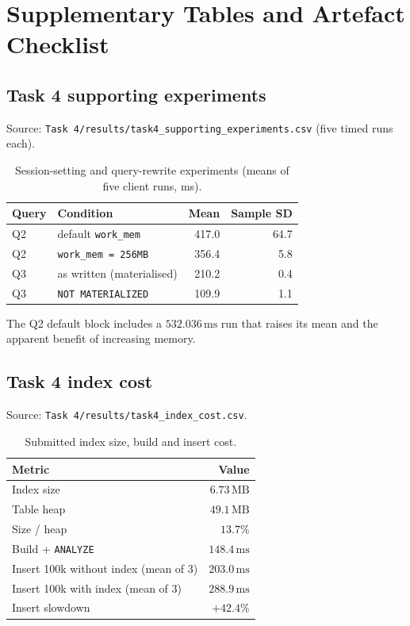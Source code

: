\section{Supplementary Tables and Artefact Checklist}
\label{app:artefacts}

\subsection{Task 4 supporting experiments}
Source: \texttt{Task 4/results/task4\_supporting\_experiments.csv} (five timed runs each).

\begin{table}[H]
\centering
\caption{Session-setting and query-rewrite experiments (means of five client runs, ms).}
\label{tab:support}
\begin{tabular}{@{}llrr@{}}
\toprule
Query & Condition & Mean & Sample SD \\
\midrule
Q2 & default \texttt{work\_mem} & 417.0 & 64.7 \\
Q2 & \texttt{work\_mem = 256MB} & 356.4 & 5.8 \\
Q3 & as written (materialised) & 210.2 & 0.4 \\
Q3 & \texttt{NOT MATERIALIZED} & 109.9 & 1.1 \\
\bottomrule
\end{tabular}
\end{table}

The Q2 default block includes a $532.036\,\mathrm{ms}$ run that raises its mean and the apparent benefit of increasing memory.

\subsection{Task 4 index cost}
Source: \texttt{Task 4/results/task4\_index\_cost.csv}.

\begin{table}[H]
\centering
\caption{Submitted index size, build and insert cost.}
\begin{tabular}{@{}lr@{}}
\toprule
Metric & Value \\
\midrule
Index size & $6.73\,\mathrm{MB}$ \\
Table heap & $49.1\,\mathrm{MB}$ \\
Size / heap & $13.7\%$ \\
Build + \texttt{ANALYZE} & $148.4\,\mathrm{ms}$ \\
Insert 100k without index (mean of 3) & $203.0\,\mathrm{ms}$ \\
Insert 100k with index (mean of 3) & $288.9\,\mathrm{ms}$ \\
Insert slowdown & $+42.4\%$ \\
\bottomrule
\end{tabular}
\end{table}

